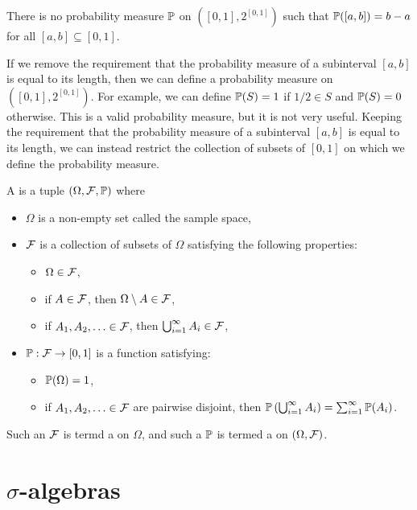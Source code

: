 \begin{theorem}
    There is no probability measure $\mathbb{P}$ on $([0,1],2^{[0,1]})$ such that $\mathbb{P}([a,b]) = b-a$ for all $[a,b] \subseteq [0,1]$.
\end{theorem}
If we remove the requirement that the probability measure of a subinterval $[a,b]$ is equal to its length, then we can define a probability measure on $([0,1],2^{[0,1]})$. For example, we can define $\mathbb{P}(S) = 1$ if $1/2 \in S$ and $\mathbb{P}(S) = 0$ otherwise. This is a valid probability measure, but it is not very useful. Keeping the requirement that the probability measure of a subinterval $[a,b]$ is equal to its length, we can instead restrict the collection of subsets of $[0,1]$ on which we define the probability measure. 

\begin{definition}
    A  is a tuple $(\Omega,\mathcal{F},\mathbb{P})$ where
    \begin{itemize}
        \item $\Omega$ is a non-empty set called the sample space,
        \item $\mathcal{F}$ is a collection of subsets of $\Omega$ satisfying the following properties:
        \begin{itemize}
            \item $\Omega \in \mathcal{F}$,
            \item if $A \in \mathcal{F}$, then $\Omega \setminus A \in \mathcal{F}$,
            \item if $A_{1},A_{2},\ldots \in \mathcal{F}$, then $\bigcup_{i=1}^{\infty}A_{i} \in \mathcal{F}$,
        \end{itemize}
        \item $\mathbb{P}:\mathcal{F}\to[0,1]$ is a function satisfying:
        \begin{itemize}
            \item $\mathbb{P}(\Omega) = 1$,
            \item if $A_{1},A_{2},\ldots \in \mathcal{F}$ are pairwise disjoint, then $\mathbb{P}\left(\bigcup_{i=1}^{\infty}A_{i}\right) = \sum_{i=1}^{\infty}\mathbb{P}(A_{i})$.
        \end{itemize}
    \end{itemize}
\end{definition}
Such an $\mathcal{F}$ is termd a  on $\Omega$, and such a $\mathbb{P}$ is termed a  on $(\Omega,\mathcal{F})$.

\section{$\sigma$-algebras}

